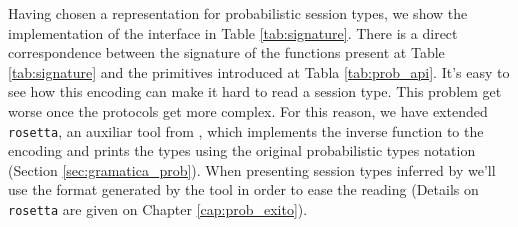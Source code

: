 Having chosen a representation for probabilistic session types, we show the
implementation of the \OCaml interface in Table \ref{tab:signature}. There is a
direct correspondence between the signature of the functions present at Table
\ref{tab:signature} and the primitives introduced at Tabla \ref{tab:prob_api}.
It's easy to see how this encoding can make it hard to read a session type. This
problem get worse once the protocols get more complex. For this reason, we have
extended \texttt{rosetta}, an auxiliar tool from \FuSe, which implements the
inverse function to the encoding and prints the types using the original
probabilistic types notation (Section \ref{sec:gramatica_prob}). When presenting
session types inferred by \OCaml we'll use the format generated by the tool in
order to ease the reading (Details on \texttt{rosetta} are given on Chapter
\ref{cap:prob_exito}).
